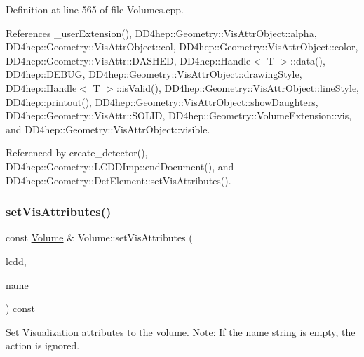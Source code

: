 Definition at line 565 of file Volumes.\+cpp.



References \+\_\+user\+Extension(), D\+D4hep\+::\+Geometry\+::\+Vis\+Attr\+Object\+::alpha, D\+D4hep\+::\+Geometry\+::\+Vis\+Attr\+Object\+::col, D\+D4hep\+::\+Geometry\+::\+Vis\+Attr\+Object\+::color, D\+D4hep\+::\+Geometry\+::\+Vis\+Attr\+::\+D\+A\+S\+H\+ED, D\+D4hep\+::\+Handle$<$ T $>$\+::data(), D\+D4hep\+::\+D\+E\+B\+UG, D\+D4hep\+::\+Geometry\+::\+Vis\+Attr\+Object\+::drawing\+Style, D\+D4hep\+::\+Handle$<$ T $>$\+::is\+Valid(), D\+D4hep\+::\+Geometry\+::\+Vis\+Attr\+Object\+::line\+Style, D\+D4hep\+::printout(), D\+D4hep\+::\+Geometry\+::\+Vis\+Attr\+Object\+::show\+Daughters, D\+D4hep\+::\+Geometry\+::\+Vis\+Attr\+::\+S\+O\+L\+ID, D\+D4hep\+::\+Geometry\+::\+Volume\+Extension\+::vis, and D\+D4hep\+::\+Geometry\+::\+Vis\+Attr\+Object\+::visible.



Referenced by create\+\_\+detector(), D\+D4hep\+::\+Geometry\+::\+L\+C\+D\+D\+Imp\+::end\+Document(), and D\+D4hep\+::\+Geometry\+::\+Det\+Element\+::set\+Vis\+Attributes().

\hypertarget{class_d_d4hep_1_1_geometry_1_1_volume_ae1d11f7a5aea7e2c7143d8ee7c4b53b7}{}\label{class_d_d4hep_1_1_geometry_1_1_volume_ae1d11f7a5aea7e2c7143d8ee7c4b53b7} 
\subsubsection{\texorpdfstring{set\+Vis\+Attributes()}{setVisAttributes()}\hspace{0.1cm}{\footnotesize\ttfamily [2/2]}}
{\footnotesize\ttfamily const \hyperlink{class_d_d4hep_1_1_geometry_1_1_volume}{Volume} \& Volume\+::set\+Vis\+Attributes (\begin{DoxyParamCaption}\item[{const \hyperlink{class_d_d4hep_1_1_geometry_1_1_l_c_d_d}{L\+C\+DD} \&}]{lcdd,  }\item[{const std\+::string \&}]{name }\end{DoxyParamCaption}) const}



Set Visualization attributes to the volume. Note\+: If the name string is empty, the action is ignored. 

